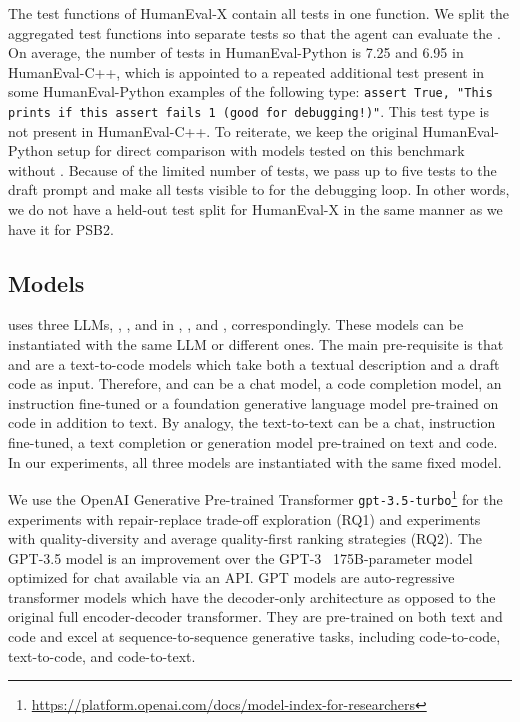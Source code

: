 The test functions of HumanEval-X contain all tests in one function. We split the aggregated test functions into separate tests so that the \rank{} agent can evaluate the . 
On average, the number of tests in HumanEval-Python is 7.25 and 6.95 in HumanEval-C++, which is appointed to a repeated additional test present in some HumanEval-Python examples of the following type: \texttt{assert True, "This prints if this assert fails 1 (good for debugging!)"}.
This test type is not present in HumanEval-C++.
To reiterate, we keep the original HumanEval-Python setup for direct comparison with models tested on this benchmark without \method{}. 
Because of the limited number of tests, we pass up to five tests to the draft prompt and make all tests visible to \method{} for the debugging loop. 
In other words, we do not have a held-out test split for HumanEval-X in the same manner as we have it for PSB2.


\subsection{Models}
\label{sec:models}

\method{} uses three LLMs, \synthmodel{}, \textmodel{}, and \debugmodel{} in \synthesize{}, \instruct{}, and \debug{}, correspondingly. 
These models can be instantiated with the same LLM or different ones. 
The main pre-requisite is that \synthmodel{} and \debug{} are a text-to-code models which take both a textual description and a draft code as input.
Therefore, \synthmodel{} and \debug{} can be a chat model, a code completion model, an instruction fine-tuned or a foundation generative language model pre-trained on code in addition to text. 
By analogy, the text-to-text \textmodel{} can be a chat, instruction fine-tuned, a text completion or generation model pre-trained on text and code.
In our experiments, all three models are instantiated with the same fixed model. 

We use the OpenAI Generative Pre-trained Transformer \texttt{gpt-3.5-turbo}\footnote{\url{https://platform.openai.com/docs/model-index-for-researchers}}  for the experiments with repair-replace trade-off exploration (RQ1) and experiments with quality-diversity and average quality-first ranking strategies (RQ2). 
The GPT-3.5 model is an improvement over the GPT-3~\cite{brown2020:language} 175B-parameter model optimized for chat available via an API.
GPT models are auto-regressive transformer models which have the decoder-only architecture as opposed to the original full encoder-decoder transformer.
They are pre-trained on both text and code and excel at sequence-to-sequence generative tasks, including code-to-code, text-to-code, and code-to-text.

